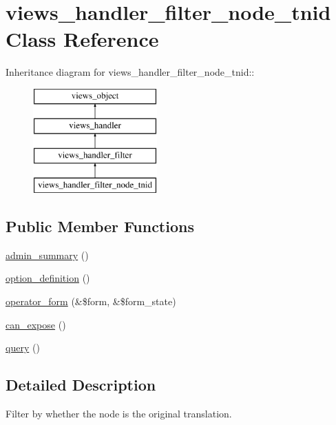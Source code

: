 \hypertarget{classviews__handler__filter__node__tnid}{
\section{views\_\-handler\_\-filter\_\-node\_\-tnid Class Reference}
\label{classviews__handler__filter__node__tnid}
}
Inheritance diagram for views\_\-handler\_\-filter\_\-node\_\-tnid::\begin{figure}[H]
\begin{center}
\leavevmode
\includegraphics[height=4cm]{classviews__handler__filter__node__tnid}
\end{center}
\end{figure}
\subsection*{Public Member Functions}
\begin{CompactItemize}
\item 
\hyperlink{classviews__handler__filter__node__tnid_037932cf19297e4b8544c24747509823}{admin\_\-summary} ()
\item 
\hyperlink{classviews__handler__filter__node__tnid_ab1f73e93ba261fff47a93a698612e25}{option\_\-definition} ()
\item 
\hyperlink{classviews__handler__filter__node__tnid_92d26c1ecccc0a2985d4195a46c7e87b}{operator\_\-form} (\&\$form, \&\$form\_\-state)
\item 
\hyperlink{classviews__handler__filter__node__tnid_9e6111d77af1aefee0b78d7b3b2c25cc}{can\_\-expose} ()
\item 
\hyperlink{classviews__handler__filter__node__tnid_7e51dd45867a8a4a3c965a09d0ecd3b6}{query} ()
\end{CompactItemize}


\subsection{Detailed Description}
Filter by whether the node is the original translation. 

